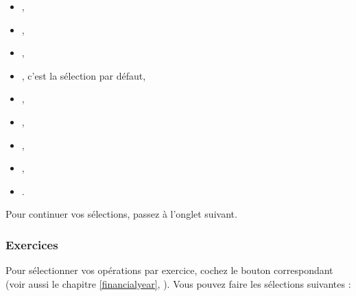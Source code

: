 \begin{itemize}
\begin{itemize}
		\item {},
		\item {},
		\item {},
		\item {}, c'est la sélection par défaut,
		\item {},
		\item {},
		\item {},
		\item {},
		\item {}.
	    \end{itemize}
\end{itemize} 


\ifIllustration
\fi

Pour continuer vos sélections, passez à l'onglet suivant.

\ifIllustration
\fi


\subsubsection{Exercices}

Pour sélectionner vos opérations par exercice, cochez le bouton correspondant  (voir aussi le chapitre \vref{financialyear}, ). Vous pouvez faire les sélections suivantes :

